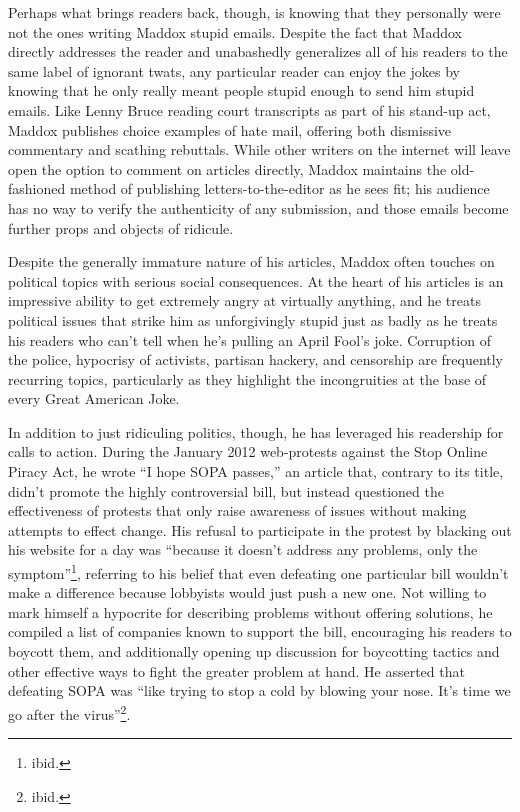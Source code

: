 Perhaps what brings readers back, though, is knowing that they personally were
not the ones writing Maddox stupid emails. Despite the fact that Maddox directly
addresses the reader and unabashedly generalizes all of his readers to the same
label of ignorant twats, any particular reader can enjoy the jokes by knowing
that he only really meant people stupid enough to send him stupid emails. Like
Lenny Bruce reading court transcripts as part of his stand-up act, Maddox
publishes choice examples of hate mail, offering both dismissive commentary and
scathing rebuttals. While other writers on the internet will leave open the
option to comment on articles directly, Maddox maintains the old-fashioned
method of publishing letters-to-the-editor as he sees fit; his audience has no
way to verify the authenticity of any submission, and those emails become
further props and objects of ridicule.

Despite the generally immature nature of his articles, Maddox often touches on
political topics with serious social consequences. At the heart of his articles
is an impressive ability to get extremely angry at virtually anything, and he
treats political issues that strike him as unforgivingly stupid just as badly as
he treats his readers who can't tell when he's pulling an April Fool's joke.
Corruption of the police, hypocrisy of activists, partisan hackery, and
censorship are frequently recurring topics, particularly as they highlight the
incongruities at the base of every Great American Joke.

In addition to just ridiculing politics, though, he has leveraged his readership
for calls to action. During the January 2012 web-protests against the Stop
Online Piracy Act, he wrote ``I hope SOPA passes,'' an article that, contrary to
its title, didn't promote the highly controversial bill, but instead questioned
the effectiveness of protests that only raise awareness of issues without making
attempts to effect change. His refusal to participate in the protest by blacking
out his website for a day was ``because it doesn't address any problems, only
the symptom''\footnote{ibid.}, referring to his belief that even defeating one
particular bill wouldn't make a difference because lobbyists would just push a
new one. Not willing to mark himself a hypocrite for describing problems without
offering solutions, he compiled a list of companies known to support the bill,
encouraging his readers to boycott them, and additionally opening up discussion
for boycotting tactics and other effective ways to fight the greater problem at
hand. He asserted that defeating SOPA was ``like trying to stop a cold by
blowing your nose. It's time we go after the virus''\footnote{ibid.}.

